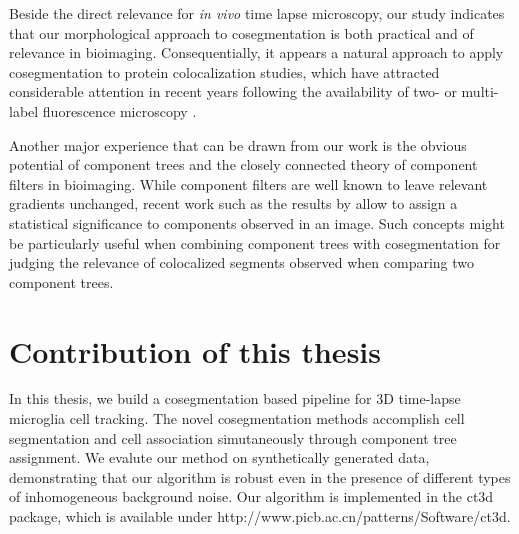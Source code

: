 Beside the direct relevance for \textit{in vivo} time lapse
microscopy, our study indicates that our morphological approach to
cosegmentation is both practical and of relevance in
bioimaging. Consequentially, it appears a natural approach to apply
cosegmentation to protein colocalization studies, which have attracted
considerable attention in recent years following the availability of
two- or multi-label fluorescence microscopy \cite{Zinchuk:08}.

Another major experience that can be drawn from our work is the obvious
potential of component trees and the closely connected theory of
component filters in bioimaging. While component filters are well
known to leave relevant gradients unchanged, recent work such as the
results by \cite{Coupier:05} allow to assign a
statistical significance to components observed in an image. Such
concepts might be particularly useful when combining component trees
with cosegmentation for judging the relevance of colocalized segments
observed when comparing two component trees.

\section{Contribution of this thesis}
In this thesis, we build a cosegmentation based pipeline for 3D time-lapse microglia cell tracking.
The novel cosegmentation methods accomplish cell segmentation and cell association simutaneously through 
component tree assignment. We evalute our method on synthetically generated data, demonstrating that our algorithm is robust even in the presence of different types of inhomogeneous background noise. Our algorithm is implemented in the ct3d package, which is available under http://www.picb.ac.cn/patterns/Software/ct3d.

